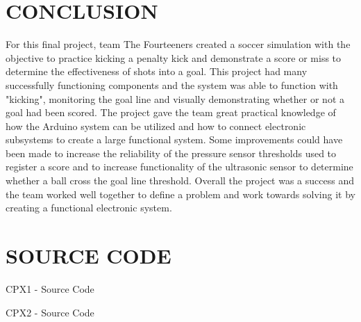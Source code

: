 \documentclass[12pt]{article}
\begin{document}
\section{CONCLUSION}
For this final project, team The Fourteeners created a soccer simulation with the objective to practice kicking a penalty kick and demonstrate a score or miss to determine the effectiveness of shots into a goal. This project had many successfully functioning components and the system was able to function with "kicking", monitoring the goal line and visually demonstrating whether or not a goal had been scored. The project gave the team great practical knowledge of how the Arduino system can be utilized and how to connect electronic subsystems to create a large functional system. Some improvements could have been made to increase the reliability of the pressure sensor thresholds used to register a score and to increase functionality of the ultrasonic sensor to determine whether a ball cross the goal line threshold. Overall the project was a success and the team worked well together to define a problem and work towards solving it by creating a functional electronic system.

\newpage



\newpage
\appendix

\section{SOURCE CODE}
CPX1 - Source Code

CPX2 - Source Code

\end{document}
